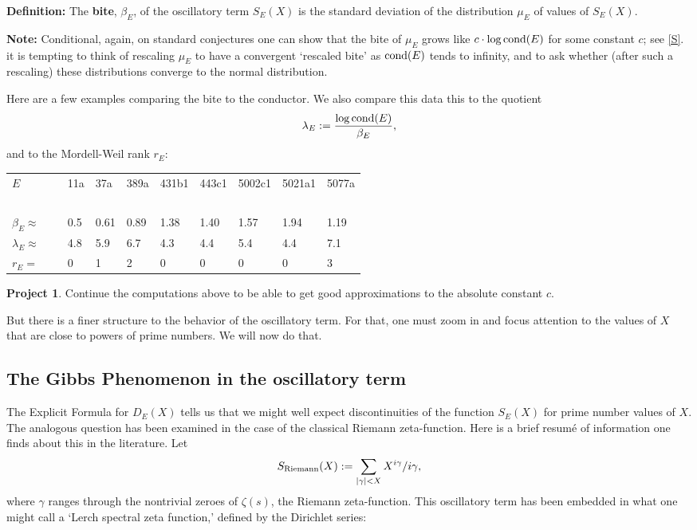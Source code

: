 \documentclass[11pt]{article}
\theoremstyle{plain}
\theoremstyle{definition}
\newtheorem{project}[theorem]{Project}
\numberwithin{equation}{section}
\numberwithin{figure}{section}
\numberwithin{table}{section}
\begin{document}
   {\bf Definition:}  The {\bf bite}, $\beta_E$, of the oscillatory term $S_E(X)$ is the standard deviation of the   distribution $\mu_E$ of values of $S_E(X)$.

    {\bf  Note: } Conditional, again,  on standard conjectures  one can show that the bite of $\mu_E$  grows like $c\cdot \log {\rm cond}(E)$ for some constant $c$; see \ref{S}. it is tempting to think of rescaling $\mu_E$ to have a convergent `rescaled bite' as ${\rm cond}(E)$ tends to infinity, and to ask whether (after such a rescaling) these distributions converge to the normal distribution.

 Here are a few examples comparing the bite to the conductor. We also compare this data this to the quotient $$\lambda_E:={\frac{ \log {\rm cond}(E)}{\beta_E}},$$ and to the Mordell-Weil rank $r_E$:



  \begin{tabular}{llllllllll}
  $E$   &\ & 11a & 37a & 389a & 431b1 & 443c1 & 5002c1 & 5021a1 & 5077a\\
\  &\ &\  &\  &\  &\ &\ &\ &\ &\ \\
  $\beta_E \approx $  &\ & 0.5 & 0.61 & 0.89 & 1.38 & 1.40 & 1.57 & 1.94 & 1.19\\
  $\lambda_E  \approx$  &\ & 4.8 & 5.9 & 6.7 & 4.3 & 4.4 & 5.4 & 4.4 & 7.1\\
  $r_E =$   &\ & 0 & 1 & 2 & 0 & 0 & 0 & 0 & 3 \end{tabular}
\vskip10pt
\begin{project} Continue the computations above to be able to get good approximations to the absolute constant $c$. \end{project}

  But there is a finer structure to the behavior of the oscillatory term. For that, one must zoom in and focus attention to the values of $X$ that are close to powers of prime numbers. We will now do that.


 \subsection{ The Gibbs Phenomenon in the oscillatory term} The Explicit Formula for $D_E(X)$ tells us that we might well expect discontinuities of the function $S_E(X)$ for prime number values of $X$. The analogous question has been  examined in the case of the classical Riemann zeta-function.  Here is a brief resum{\'e} of information one finds about this in the literature. Let $$S_{\rm Riemann}(X): = \sum_{|\gamma|<X}X^{i\gamma}/i\gamma,$$ where $\gamma$ ranges through the nontrivial zeroes of $\zeta(s)$, the Riemann zeta-function. This oscillatory term has been  embedded in what one might call a `Lerch spectral zeta function,' defined by the Dirichlet series:
\end{document}
